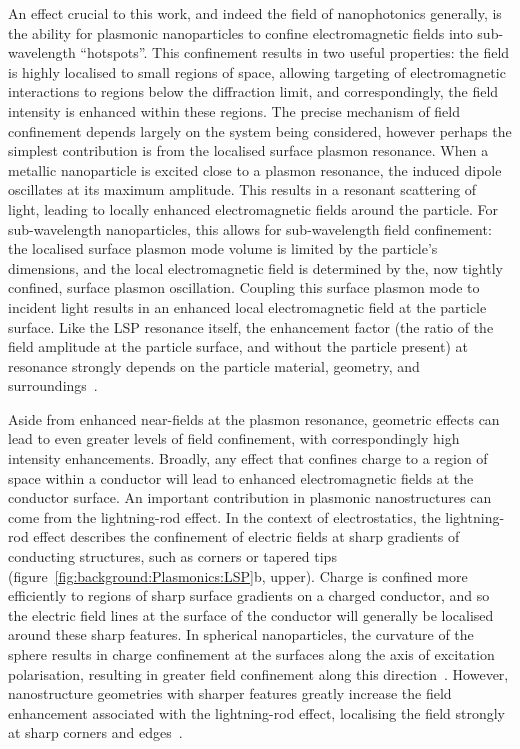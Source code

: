 An effect crucial to this work, and indeed the field of nanophotonics generally, is the ability for plasmonic nanoparticles to confine electromagnetic fields into sub-wavelength ``hotspots''. This confinement results in two useful properties: the field is highly localised to small regions of space, allowing targeting of electromagnetic interactions to regions below the diffraction limit, and correspondingly, the field intensity is enhanced within these regions. The precise mechanism of field confinement depends largely on the system being considered, however perhaps the simplest contribution is from the localised surface plasmon resonance. 
When a metallic nanoparticle is excited close to a plasmon resonance, the induced dipole oscillates at its maximum amplitude. This results in a resonant scattering of light, leading to locally enhanced electromagnetic fields around the particle. For sub-wavelength nanoparticles, this allows for sub-wavelength field confinement: the localised surface plasmon mode volume is limited by the particle's dimensions, and the local electromagnetic field is determined by the, now tightly confined, surface plasmon oscillation. Coupling this surface plasmon mode to incident light results in an enhanced local electromagnetic field at the particle surface. Like the LSP resonance itself, the enhancement factor (the ratio of the field amplitude at the particle surface, and without the particle present) at resonance strongly depends on the particle material, geometry, and surroundings~\cite{Dynich2009, Tanabe2008}.

Aside from enhanced near-fields at the plasmon resonance, geometric effects can lead to even greater levels of field confinement, with correspondingly high intensity enhancements. Broadly, any effect that confines charge to a region of space within a conductor will lead to enhanced electromagnetic fields at the conductor surface. 
An important contribution in plasmonic nanostructures can come from the lightning-rod effect. In the context of electrostatics, the lightning-rod effect describes the confinement of electric fields at sharp gradients of conducting structures, such as corners or tapered tips (figure~\ref{fig:background:Plasmonics:LSP}b, upper). Charge is confined more efficiently to regions of sharp surface gradients on a charged conductor, and so the electric field lines at the surface of the conductor will generally be localised around these sharp features. In spherical nanoparticles, the curvature of the sphere results in charge confinement at the surfaces along the axis of excitation polarisation, resulting in greater field confinement along this direction~\cite{Tanabe2008}. However, nanostructure geometries with sharper features greatly increase the field enhancement associated with the lightning-rod effect, localising the field strongly at sharp corners and edges~\cite{Dreaden2011, Lee2010, Valev2012d}.

